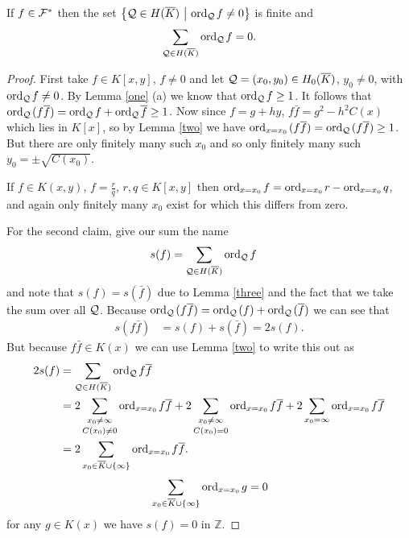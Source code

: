 \documentclass[english,11pt,a4paper]{article}
\begin{document}
\begin{lemma}\label{sform}
  If $f \in \mathcal{F}^*$ then the set $\big \{ \mathcal{Q} \in H(\overline K) \ \big | \ \text{ord}_{\mathcal{Q}}\hspace{0.4mm} f \neq 0 \big \}$ is finite and
  \begin{align*}
    \sum_{\mathcal{Q} \in H(\overline K)} \text{ord}_{\mathcal{Q}}\hspace{0.4mm} f = 0.
  \end{align*}
  \begin{proof}
    First take $f \in K[x,y]$, $f \neq 0$ and let $\mathcal{Q} = (x_0,y_0) \in H_0(\overline K)$, $y_0 \neq 0$, with $\text{ord}_{\mathcal{Q}}\hspace{0.4mm} f \neq 0$. By Lemma \ref{one} (a) we know that $\text{ord}_{\mathcal{Q}}\hspace{0.4mm} f \geq 1$. It follows that $\text{ord}_{\mathcal{Q}}\hspace{0.4mm} (f \overline f) = \text{ord}_{\mathcal{Q}}\hspace{0.4mm} f + \text{ord}_{\mathcal{Q}}\hspace{0.4mm} \overline f \geq 1$. Now since $f = g + h y$, $f \bar f = g^2 - h^2 C(x)$ which lies in $K[x]$, so by Lemma \ref{two} we have $\text{ord}_{x=x_0}\hspace{0.4mm} (f \overline f) = \text{ord}_{\mathcal{Q}}\hspace{0.4mm} (f \overline f) \geq 1$. But there are only finitely many such $x_0$ and so only finitely many such $y_0 = \pm \sqrt{C(x_0)}$.

    If $f \in K(x,y)$, $f = \frac r q$, $r, q \in K[x,y]$ then $\text{ord}_{x=x_0}\hspace{0.4mm} f = \text{ord}_{x=x_0}\hspace{0.4mm} r - \text{ord}_{x=x_0}\hspace{0.4mm} q$, and again only finitely many $x_0$ exist for which this differs from zero.

    For the second claim, give our sum the name
    \begin{align*}
      s(f) &= \sum_{\mathcal{Q} \in H(\overline K)} \text{ord}_{\mathcal{Q}}\hspace{0.4mm} f
    \end{align*}
    and note that $s(f) = s(\bar f)$ due to Lemma \ref{three} and the fact that we take the sum over all $\mathcal{Q}$. Because $\text{ord}_{\mathcal{Q}}\hspace{0.4mm} (f \overline f ) = \text{ord}_{\mathcal{Q}}\hspace{0.4mm} (f) + \text{ord}_{\mathcal{Q}}\hspace{0.4mm} ( \overline f )$ we can see that
    \begin{align*}
      s(f \bar f) &= s(f) + s(\bar f) = 2 s(f).
    \end{align*}
    But because $f \bar f \in K(x)$ we can use Lemma \ref{two} to write this out as
    \begin{align*}
      2s(f) &= \sum_{\mathcal{Q} \in H(\overline K)} \text{ord}_{\mathcal{Q}}\hspace{0.4mm} f \overline f\\
            &=2 \mathop{\sum_{x_0 \neq \infty}}_{C(x_0) \neq 0} \text{ord}_{x=x_0}\hspace{0.4mm} f \overline f 
            + 2 \mathop{\sum_{x_0 \neq \infty}}_{C(x_0) = 0} \text{ord}_{x=x_0}\hspace{0.4mm} f \overline f 
            + 2 \sum_{x_0 = \infty} \text{ord}_{x=x_0}\hspace{0.4mm} f \overline f\\
            &=2 \sum_{x_0 \in \overline K \cup \{ \infty \}} \text{ord}_{x=x_0}\hspace{0.4mm} f \overline f.
    \end{align*}
    \begin{align*}
    \rlap{\hspace{-45mm} Since}
      \sum_{x_0 \in \bar K \cup \{ \infty \}} \ordx g = 0
    \end{align*}
    for any $g \in K(x)$ we have $s(f) = 0$ in $\mathds{Z}$.
  \end{proof}
\end{lemma}
\end{document}
